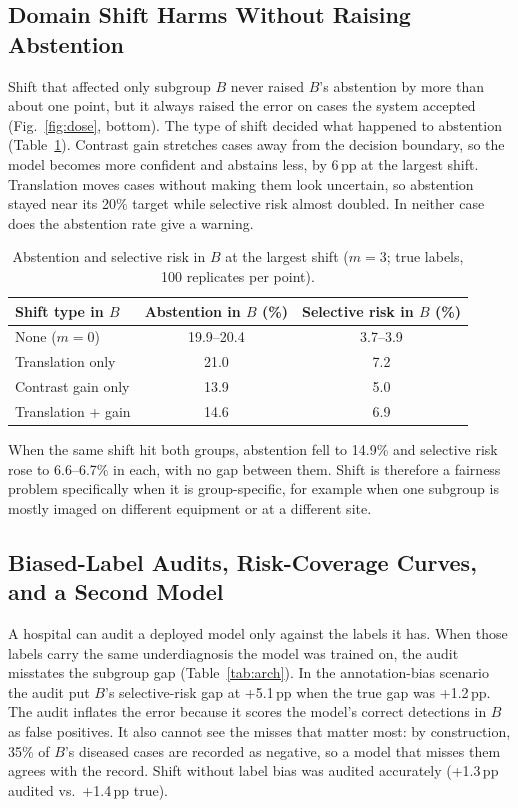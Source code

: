 \documentclass[conference]{IEEEtran}
\newcommand{\pp}{\,pp}
\begin{document}
\subsection{Domain Shift Harms Without Raising Abstention}

Shift that affected only subgroup $B$ never raised $B$'s abstention by more than about one point, but it always raised the error on cases the system accepted (Fig.~\ref{fig:dose}, bottom). The type of shift decided what happened to abstention (Table~\ref{tab:shift}). Contrast gain stretches cases away from the decision boundary, so the model becomes more confident and abstains less, by 6\pp{} at the largest shift. Translation moves cases without making them look uncertain, so abstention stayed near its 20\% target while selective risk almost doubled. In neither case does the abstention rate give a warning.

\begin{table}[t]
\centering
\caption{Abstention and selective risk in $B$ at the largest shift ($m=3$; true labels, 100 replicates per point).}
\label{tab:shift}
\footnotesize
\begin{tabular}{@{}lcc@{}}
\toprule
Shift type in $B$ & Abstention in $B$ (\%) & Selective risk in $B$ (\%) \\
\midrule
None ($m=0$) & 19.9--20.4 & 3.7--3.9 \\
Translation only & 21.0 & 7.2 \\
Contrast gain only & 13.9 & 5.0 \\
Translation + gain & 14.6 & 6.9 \\
\bottomrule
\end{tabular}
\end{table}

When the same shift hit both groups, abstention fell to 14.9\% and selective risk rose to 6.6--6.7\% in each, with no gap between them. Shift is therefore a fairness problem specifically when it is group-specific, for example when one subgroup is mostly imaged on different equipment or at a different site.

\subsection{Biased-Label Audits, Risk-Coverage Curves, and a Second Model}

A hospital can audit a deployed model only against the labels it has. When those labels carry the same underdiagnosis the model was trained on, the audit misstates the subgroup gap (Table~\ref{tab:arch}). In the annotation-bias scenario the audit put $B$'s selective-risk gap at +5.1\pp{} when the true gap was +1.2\pp. The audit inflates the error because it scores the model's correct detections in $B$ as false positives. It also cannot see the misses that matter most: by construction, 35\% of $B$'s diseased cases are recorded as negative, so a model that misses them agrees with the record. Shift without label bias was audited accurately (+1.3\pp{} audited vs.\ +1.4\pp{} true).
\end{document}
